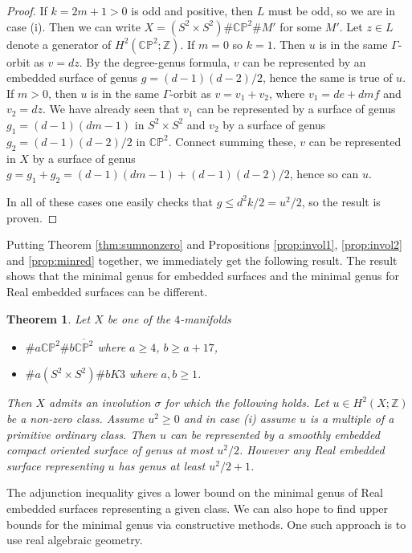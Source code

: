 \documentclass{amsart}
\newtheorem{theorem}{Theorem}[section]
\theoremstyle{definition}
\theoremstyle{remark}
\numberwithin{equation}{section}
\begin{document}
\begin{proof}
If $k = 2m+1 > 0$ is odd and positive, then $L$ must be odd, so we are in case (i). Then we can write $X = (S^2 \times S^2) \# \mathbb{CP}^2 \# M'$ for some $M'$. Let $z \in L$ denote a generator of $H^2(\mathbb{CP}^2 ; \mathbb{Z})$. If $m=0$ so $k=1$. Then $u$ is in the same $\Gamma$-orbit as $v = dz$. By the degree-genus formula, $v$ can be represented by an embedded surface of genus $g = (d-1)(d-2)/2$, hence the same is true of $u$. If $m > 0$, then $u$ is in the same $\Gamma$-orbit as $v = v_1 + v_2$, where $v_1 = de + dmf$ and $v_2 = dz$. We have already seen that $v_1$ can be represented by a surface of genus $g_1 = (d-1)(dm-1)$ in $S^2 \times S^2$ and $v_2$ by a surface of genus $g_2 = (d-1)(d-2)/2$ in $\mathbb{CP}^2$. Connect summing these, $v$ can be represented in $X$ by a surface of genus $g = g_1 + g_2 = (d-1)(dm-1) + (d-1)(d-2)/2$, hence so can $u$.

In all of these cases one easily checks that $g \le d^2k/2 = u^2/2$, so the result is proven.
\end{proof}

Putting Theorem \ref{thm:sumnonzero} and Propositions \ref{prop:invol1}, \ref{prop:invol2} and \ref{prop:minred} together, we immediately get the following result. The result shows that the minimal genus for embedded surfaces and the minimal genus for Real embedded surfaces can be different.

\begin{theorem}\label{thm:minrg}
Let $X$ be one of the $4$-manifolds
\begin{itemize}
\item[(i)]{$\# a \mathbb{CP}^2 \# b \overline{\mathbb{CP}^2}$ where $a \ge 4$, $b \ge a+17$,}
\item[(ii)]{$\# a(S^2 \times S^2) \# b K3$ where $a,b \ge 1$.}
\end{itemize}
Then $X$ admits an involution $\sigma$ for which the following holds. Let $u \in H^2(X ; \mathbb{Z})$ be a non-zero class. Assume $u^2 \ge 0$ and in case (i) assume $u$ is a multiple of a primitive ordinary class. Then $u$ can be represented by a smoothly embedded compact oriented surface of genus at most $u^2/2$. However any Real embedded surface representing $u$ has genus at least $u^2/2 + 1$.
\end{theorem}


The adjunction inequality gives a lower bound on the minimal genus of Real embedded surfaces representing a given class. We can also hope to find upper bounds for the minimal genus via constructive methods. One such approach is to use real algebraic geometry.
\end{document}

